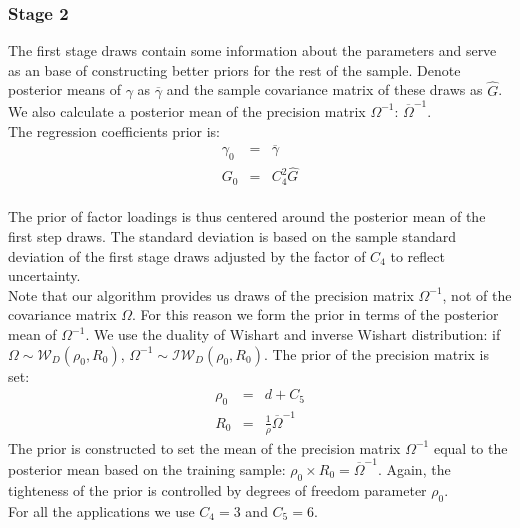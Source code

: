 \documentclass[12pt]{article}
\begin{document}
\subsubsection{Stage 2}
The first stage draws contain some information about the parameters and serve as an base of constructing better priors for the rest of the sample. Denote posterior means of $\gamma$ as $\overline{\gamma}$ and the sample covariance matrix of these draws as $\widehat{G}$. We also calculate a posterior mean of the precision matrix $\Omega^{-1}$: $\overline{\Omega}^{-1}$. \\
The regression coefficients prior is:
\begin{eqnarray*}
	\gamma_{0} &=& \overline{\gamma} \\ 
	G_{0} &=& C_{4}^{2} \widehat{G}
\end{eqnarray*}\\
The prior of factor loadings is thus centered around the posterior mean of the first step draws. The  standard deviation is based on the sample standard deviation of the first stage draws adjusted by the factor of $C_{4}$ to reflect uncertainty.\\
 Note that our algorithm  provides us draws of the precision matrix $\Omega^{-1}$, not of the covariance matrix $\Omega$. For this reason we form the prior in terms of the posterior mean of ${\Omega}^{-1}$. We use the duality of Wishart and inverse Wishart distribution: if $\Omega \sim \mathcal{W}_D\left(\rho_0, R_0 \right)$, $\Omega^{-1} \sim \mathcal{IW}_D\left(\rho_0, R_0 \right)$. The prior of the precision matrix is set:
\begin{eqnarray*}
	\rho_{0} &=& d + C_{5} \\ 
	R_{0} &=& \frac{1}{\rho} \overline{\Omega}^{-1}
\end{eqnarray*}
The prior is constructed to set the mean of the precision matrix $\Omega^{-1}$ equal to the posterior mean based on the training sample: $\rho_{0} \times R_{0} =\overline{\Omega}^{-1} $. Again, the tighteness of the prior is controlled by degrees of freedom parameter $\rho_{0}$. \\
For all the applications we use $C_{4} = 3$ and $C_5 = 6$.
\end{document}
